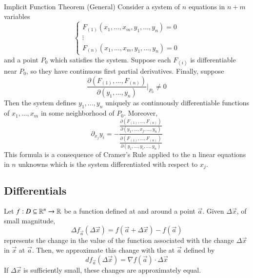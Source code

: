 \documentclass[12pt]{report}
\begin{document}
\begin{appendices}
    \begin{namthm}{Implicit Function Theorem (General)}{}
        Consider a system of $n$ equations in $n+m$ variables \begin{equation}
            \left\{\begin{array}{l} F_{(1)}(x_1,...,x_m,y_1,...,y_n) = 0 \\ \vdots \\ F_{(n)}(x_1,...,x_m,y_1,...,y_n) = 0 \end{array}\right.
        \end{equation}
        and a point $P_0$ which satisfies the system. Suppose each $F_{(i)}$ is differentiable near $P_0$, so they have continuous first partial derivatives. Finally, suppose \begin{equation}
            \frac{\partial(F_{(1)},...,F_{(n)})}{\partial(y_1,...,y_n)}\Big\rvert_{P_0} \neq 0
        \end{equation}
        Then the system defines $y_1,...,y_n$ uniquely as continuously differentiable functions of $x_1,...,x_m$ in some neighborhood of $P_0$. Moreover, \begin{equation}
            \partial_{x_j}y_i = -\frac{\frac{\partial(F_{(1)},...,F_{(n)})}{\partial(y_1,...,x_j,...,y_n)}}{\frac{\partial(F_{(1)},...,F_{(n)})}{\partial(y_1,...,y_i,...,y_n)}}
        \end{equation}
        This formula is a consequence of Cramer's Rule applied to the n linear equations in $n$ unknowns which is the system differentiated with respect to $x_j$.
    \end{namthm}



    \subsection{Differentials}


    \begin{defn}{}{}
        Let $f:D\subseteq \mathbb R^n\rightarrow \mathbb R$ be a function defined at and around a point $\vec{a}$. Given $\Delta \vec{x}$, of small magnitude, \begin{equation}
            \Delta f_{\vec{a}}(\Delta \vec{x}) = f(\vec{a}+\Delta \vec{x}) - f(\vec{a})
        \end{equation}
        represents the change in the value of the function associated with the change $\Delta \vec{x}$ in $\vec{x}$ at $\vec{a}$. Then, we approximate this change with the  at $\vec{a}$ defined by \begin{equation}
            df_{\vec{a}}(\Delta \vec{x}) = \nabla f(\vec{a}) \cdot \Delta \vec{x}
        \end{equation}
        If $\Delta \vec{x}$ is sufficiently small, these changes are approximately equal.
    \end{defn}



\end{appendices}
\end{document}
